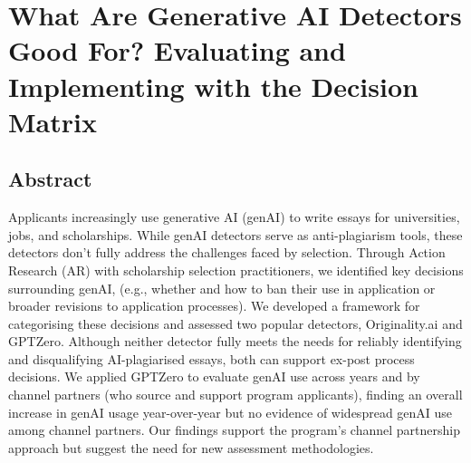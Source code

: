 

\chapter{\label{ch:genai}What Are Generative AI Detectors Good For? Evaluating and Implementing with the Decision Matrix}

\minitoc

\section{Abstract}
Applicants increasingly use generative AI (genAI) to write essays for universities, jobs, and scholarships. While genAI detectors serve as anti-plagiarism tools, these detectors don’t fully address the challenges faced by selection. Through Action Research (AR) with scholarship selection practitioners, we identified key decisions surrounding genAI, (e.g., whether and how to ban their use in application or broader revisions to application processes). We developed a framework for categorising these decisions and assessed two popular detectors, Originality.ai and GPTZero. Although neither detector fully meets the needs for reliably identifying and disqualifying AI-plagiarised essays, both can support ex-post process decisions. We applied GPTZero to evaluate genAI use across years and by channel partners (who source and support program applicants), finding an overall increase in genAI usage year-over-year but no evidence of widespread genAI use among channel partners. Our findings support the program’s channel partnership approach but suggest the need for new assessment methodologies.

